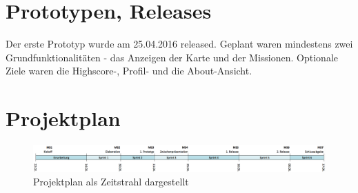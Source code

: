 \section{Prototypen, Releases}
Der erste Prototyp wurde am 25.04.2016 released. 
Geplant waren mindestens zwei Grundfunktionalitäten - das Anzeigen der Karte und der Missionen. 
Optionale Ziele waren die Highscore-, Profil- und die About-Ansicht.




\section{Projektplan}

\begin{figure}[H]
	\centering
	\includegraphics[width=\textwidth]{images/projektmanagement/zeitstrahl.png}
	\caption{Projektplan als Zeitstrahl dargestellt}
	\label{image-project-plan-timeline}
\end{figure}

